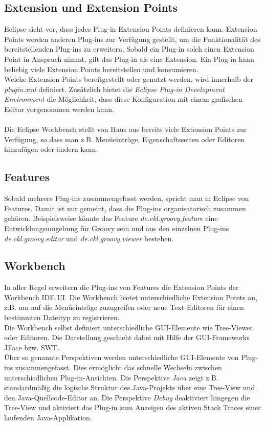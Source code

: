 \documentclass[a4paper,12pt]{scrreprt}
\begin{document}
\subsection{Extension und Extension Points}
Eclipse sieht vor, dass jedes Plug-in Extension Points definieren kann. Extension Points werden anderen Plug-ins zur Verfügung gestellt, um die Funktionalität des bereitstellenden Plug-ins zu erweitern.
Sobald ein Plug-in solch einen Extension Point in Anspruch nimmt, gilt das Plug-in als eine Extension. Ein Plug-in kann beliebig viele Extension Points bereitstellen und konsumieren.\\
Welche Extension Points bereitgestellt oder genutzt werden, wird innerhalb der \textit{plugin.xml} definiert. Zusätzlich bietet die \textit{Eclipse Plug-in Development Environment} die Möglichkeit, dass diese Konfiguration mit einem grafischen Editor vorgenommen werden kann.
\\
\\
Die Eclipse Workbench stellt von Haus aus bereits viele Extension Points zur Verfügung, so dass man z.B. Menüeinträge, Eigenschaftsseiten oder Editoren hinzufügen oder ändern kann.
\subsection{Features}
Sobald mehrere Plug-ins zusammengefasst werden, spricht man in Eclipse von Features. Damit ist nur gemeint, dass die Plug-ins organisatorisch zusammen gehören. Beispielsweise könnte das Feature \textit{de.ckl.groovy.feature} eine Entwicklungsumgebung für Groovy sein und aus den einzelnen Plug-ins \textit{de.ckl.groovy.editor} und \textit{de.ckl.groovy.viewer} bestehen.
\subsection{Workbench}
In aller Regel erweitern die Plug-ins von Features die Extension Points der Workbench IDE UI. Die Workbench bietet unterschiedliche Extension Points an, z.B. um auf die Menüeinträge zuzugreifen oder neue Text-Editoren für einen bestimmten Dateityp zu registrieren.\\
Die Workbench selbst definiert unterschiedliche GUI-Elemente wie Tree-Viewer oder Editoren. Die Darstellung geschieht dabei mit Hilfe der GUI-Frameworks JFace bzw. SWT.\\
Über so genannte Perspektiven werden unterschiedliche GUI-Elemente von Plug-ins zusammengefasst. Dies ermöglicht das schnelle Wechseln zwischen un\-ter\-schied\-lichen Plug-in-Ansichten. Die Perspektive \textit{Java} zeigt z.B. standardmäßig die logische Struktur des Java-Projekts über eine Tree-View und den Java-Quellcode-Editor an. Die Perspektive \textit{Debug} deaktiviert hingegen die Tree-View und aktiviert das Plug-in zum Anzeigen des aktiven Stack Traces einer laufenden Java-Applikation.
\end{document}
